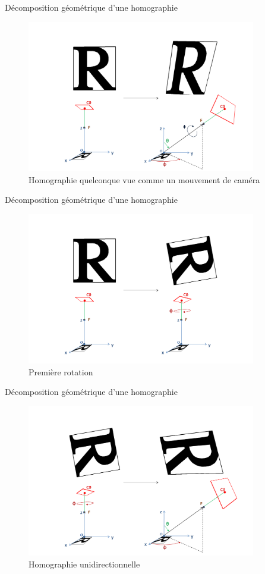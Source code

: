 \documentclass[c,12pt]{beamer}
\begin{document}
  \begin{frame}{Décomposition géométrique d'une homographie}
  \begin{figure}
   \centering
   \includegraphics[width=100mm]{beamer_decompo_all.png}
   \caption{Homographie quelconque vue comme un mouvement de caméra}
  \end{figure}
  \end{frame}

  \begin{frame}{Décomposition géométrique d'une homographie}
  \begin{figure}
   \centering
   \includegraphics[width=100mm]{beamer_decompo1_rotation_phi.png}
   \caption{Première rotation}
  \end{figure}
  \end{frame}

  \begin{frame}{Décomposition géométrique d'une homographie}
  \begin{figure}
   \centering
   \includegraphics[width=100mm]{beamer_decompo2_homo_part.png}
   \caption{Homographie unidirectionnelle}
  \end{figure}
  \end{frame}
\end{document}
